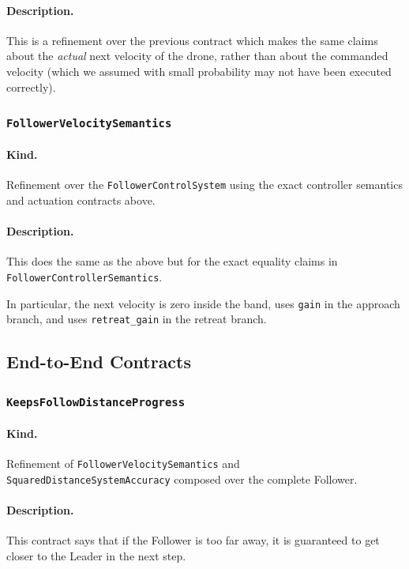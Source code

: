 \documentclass{article}
\begin{document}
\paragraph{Description.} This is a refinement over the previous contract which makes the same claims about the \textit{actual} next velocity of the drone, rather than about the commanded velocity (which we assumed with small probability may not have been executed correctly). 

\subsubsection{\texttt{FollowerVelocitySemantics}}

\paragraph{Kind.} Refinement over the \texttt{FollowerControlSystem} using the exact controller semantics and actuation contracts above.

\paragraph{Description.} This does the same as the above but for the exact equality claims in \texttt{FollowerControllerSemantics}.

In particular, the next velocity is zero inside the band, uses \texttt{gain} in
the approach branch, and uses \texttt{retreat\_gain} in the retreat branch.

\subsection{End-to-End Contracts}

\subsubsection{\texttt{KeepsFollowDistanceProgress}}

\paragraph{Kind.} Refinement of \texttt{FollowerVelocitySemantics} and \texttt{SquaredDistanceSystemAccuracy} composed over the complete Follower.

\paragraph{Description.} This contract says that if the Follower is too far away, it is guaranteed to get closer to the Leader in the next step.
\end{document}
